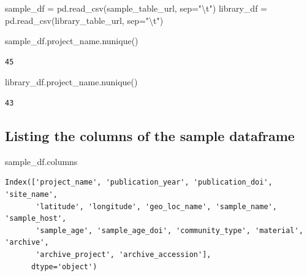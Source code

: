 \documentclass[
  letterpaper,
]{book}
\newenvironment{Shaded}{}{}
\newcommand{\CharTok}[1]{\textcolor[rgb]{0.01,0.18,0.38}{#1}}
\newcommand{\NormalTok}[1]{\textcolor[rgb]{0.14,0.16,0.18}{#1}}
\newcommand{\OperatorTok}[1]{\textcolor[rgb]{0.14,0.16,0.18}{#1}}
\newcommand{\StringTok}[1]{\textcolor[rgb]{0.01,0.18,0.38}{#1}}
\begin{document}
\begin{Shaded}
\begin{Highlighting}[]
\NormalTok{sample\_df }\OperatorTok{=}\NormalTok{ pd.read\_csv(sample\_table\_url, sep}\OperatorTok{=}\StringTok{"}\CharTok{\textbackslash{}t}\StringTok{"}\NormalTok{)}
\NormalTok{library\_df }\OperatorTok{=}\NormalTok{ pd.read\_csv(library\_table\_url, sep}\OperatorTok{=}\StringTok{"}\CharTok{\textbackslash{}t}\StringTok{"}\NormalTok{)}
\end{Highlighting}
\end{Shaded}

\begin{Shaded}
\begin{Highlighting}[]
\NormalTok{sample\_df.project\_name.nunique()}
\end{Highlighting}
\end{Shaded}

\begin{verbatim}
45
\end{verbatim}

\begin{Shaded}
\begin{Highlighting}[]
\NormalTok{library\_df.project\_name.nunique()}
\end{Highlighting}
\end{Shaded}

\begin{verbatim}
43
\end{verbatim}

\hypertarget{listing-the-columns-of-the-sample-dataframe}{%
\subsection{Listing the columns of the sample
dataframe}\label{listing-the-columns-of-the-sample-dataframe}}

\begin{Shaded}
\begin{Highlighting}[]
\NormalTok{sample\_df.columns}
\end{Highlighting}
\end{Shaded}

\begin{verbatim}
Index(['project_name', 'publication_year', 'publication_doi', 'site_name',
       'latitude', 'longitude', 'geo_loc_name', 'sample_name', 'sample_host',
       'sample_age', 'sample_age_doi', 'community_type', 'material', 'archive',
       'archive_project', 'archive_accession'],
      dtype='object')
\end{verbatim}
\end{document}
